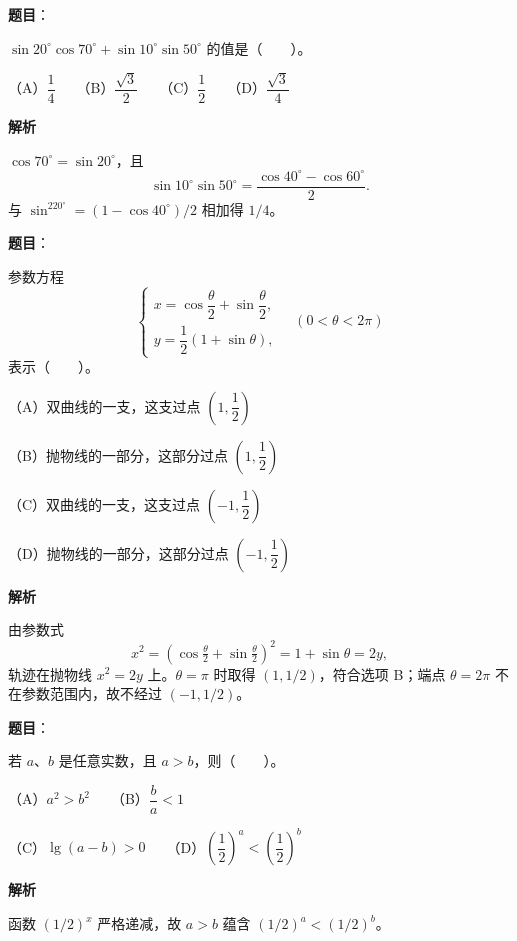 \begin{answer}

\textbf{题目}：

$\sin20^\circ\cos70^\circ+\sin10^\circ\sin50^\circ$ 的值是\mbox{（　　）}。

（A）$\dfrac14$　　（B）$\dfrac{\sqrt3}{2}$　　（C）$\dfrac12$　　（D）$\dfrac{\sqrt3}{4}$

\textbf{解析}

$\cos70^\circ=\sin20^\circ$，且
\nopagebreak[4]
\[
\sin10^\circ\sin50^\circ=\frac{\cos40^\circ-\cos60^\circ}{2}.
\]
与 $\sin^220^\circ=(1-\cos40^\circ)/2$ 相加得 $1/4$。


\end{answer}
\begin{answer}

\textbf{题目}：

参数方程
\nopagebreak[4]
\[
\begin{cases}
x=\cos\dfrac\theta2+\sin\dfrac\theta2,\\
y=\dfrac12(1+\sin\theta),
\end{cases}\quad(0<\theta<2\pi)
\]
表示\mbox{（　　）}。

（A）双曲线的一支，这支过点 $\left(1,\dfrac12\right)$

（B）抛物线的一部分，这部分过点 $\left(1,\dfrac12\right)$

（C）双曲线的一支，这支过点 $\left(-1,\dfrac12\right)$

（D）抛物线的一部分，这部分过点 $\left(-1,\dfrac12\right)$

\textbf{解析}

由参数式
\nopagebreak[4]
\[
x^2=(\cos\tfrac\theta2+\sin\tfrac\theta2)^2=1+\sin\theta=2y,
\]
轨迹在抛物线 $x^2=2y$ 上。$\theta=\pi$ 时取得 $(1,1/2)$，符合选项 B；端点 $\theta=2\pi$ 不在参数范围内，故不经过 $(-1,1/2)$。


\end{answer}
\begin{answer}

\textbf{题目}：

若 $a\text{、}b$ 是任意实数，且 $a>b$，则\mbox{（　　）}。

（A）$a^2>b^2$　　（B）$\dfrac ba<1$

（C）$\lg(a-b)>0$　　（D）$\left(\dfrac12\right)^a<\left(\dfrac12\right)^b$

\textbf{解析}

函数 $(1/2)^x$ 严格递减，故 $a>b$ 蕴含 $(1/2)^a<(1/2)^b$。


\end{answer}
